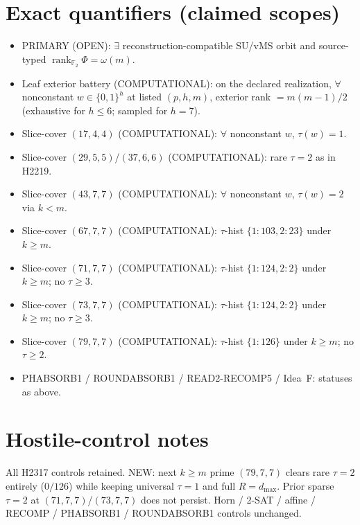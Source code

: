 \documentclass[11pt]{article}
\begin{document}
\section*{Exact quantifiers (claimed scopes)}
\begin{itemize}
\item PRIMARY (OPEN): $\exists$ reconstruction-compatible SU/vMS orbit and source-typed
  $\operatorname{rank}_{\mathbb F_2}\Phi=\omega(m)$.
\item Leaf exterior battery (COMPUTATIONAL): on the declared realization, $\forall$ nonconstant
  $w\in\{0,1\}^h$ at listed $(p,h,m)$, exterior rank $=m(m-1)/2$
  (exhaustive for $h\le6$; sampled for $h{=}7$).
\item Slice-cover $(17,4,4)$ (COMPUTATIONAL): $\forall$ nonconstant $w$, $\tau(w)=1$.
\item Slice-cover $(29,5,5)$/$(37,6,6)$ (COMPUTATIONAL): rare $\tau{=}2$ as in H2219.
\item Slice-cover $(43,7,7)$ (COMPUTATIONAL): $\forall$ nonconstant $w$, $\tau(w)=2$ via $k{<}m$.
\item Slice-cover $(67,7,7)$ (COMPUTATIONAL): $\tau$-hist $\{1{:}103,2{:}23\}$ under $k{\ge}m$.
\item Slice-cover $(71,7,7)$ (COMPUTATIONAL): $\tau$-hist $\{1{:}124,2{:}2\}$ under $k{\ge}m$;
  no $\tau{\ge}3$.
\item Slice-cover $(73,7,7)$ (COMPUTATIONAL): $\tau$-hist $\{1{:}124,2{:}2\}$ under $k{\ge}m$;
  no $\tau{\ge}3$.
\item Slice-cover $(79,7,7)$ (COMPUTATIONAL): $\tau$-hist $\{1{:}126\}$ under $k{\ge}m$;
  no $\tau{\ge}2$.
\item PHABSORB1 / ROUNDABSORB1 / READ2-RECOMP5 / Idea~F: statuses as above.
\end{itemize}

\section*{Hostile-control notes}
All H2317 controls retained. NEW: next $k{\ge}m$ prime $(79,7,7)$ clears rare
$\tau{=}2$ entirely ($0/126$) while keeping universal $\tau{=}1$ and full $R{=}d_{\max}$.
Prior sparse $\tau{=}2$ at $(71,7,7)$/$(73,7,7)$ does not persist. Horn / 2-SAT / affine /
RECOMP / PHABSORB1 / ROUNDABSORB1 controls unchanged.
\end{document}
